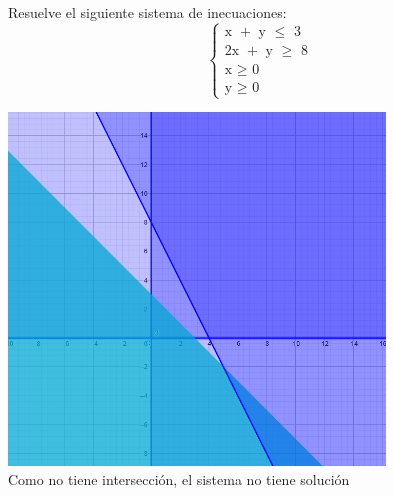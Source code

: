 \documentclass[addpoints,spanish, 12pt,a4paper]{exam}
\begin{document}
\begin{questions}
\question[8] Resuelve el siguiente sistema de inecuaciones:
\[\left\{ {\begin{array}{*{20}{c}}
  {{\text{x }} + {\text{ y }} \leqslant {\text{ 3}}} \\ 
  {{\text{2x }} + {\text{ y }} \geqslant {\text{ 8}}} \\ 
  {{\text{x }} \geqslant {\text{ 0}}} \\ 
  {{\text{y }} \geqslant {\text{ 0}}} 
\end{array}} \right.\]
\begin{solution}
    \includegraphics[width=10cm]{pendientes_1_bach/1_sociales/prog_lin.png} \\
    Como no tiene intersección, el sistema no tiene solución
\end{solution}





\end{questions}
\end{document}

